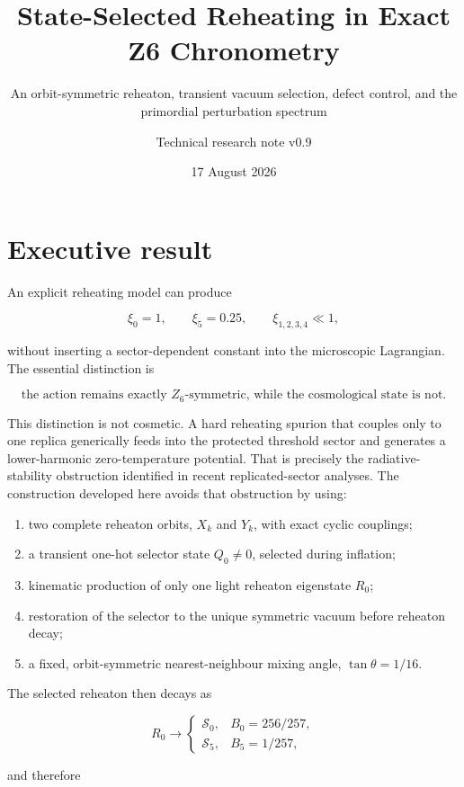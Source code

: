\documentclass[
  10pt,
]{article}
\title{State-Selected Reheating in Exact Z6 Chronometry}
\subtitle{An orbit-symmetric reheaton, transient vacuum selection,
defect control, and the primordial perturbation spectrum}
\author{Technical research note v0.9}
\date{17 August 2026}
\providecommand{\tightlist}{%
  \setlength{\itemsep}{0pt}\setlength{\parskip}{0pt}}
\begin{document}
\maketitle

{
\setcounter{tocdepth}{3}
\tableofcontents
}
\section{Executive result}\label{executive-result}

An explicit reheating model can produce

\[
\xi_0=1,
\qquad
\xi_5=0.25,
\qquad
\xi_{1,2,3,4}\ll1,
\]

without inserting a sector-dependent constant into the microscopic
Lagrangian. The essential distinction is

\[
\boxed{
\text{the action remains exactly }Z_6\text{-symmetric, while the cosmological state is not.}
}
\]

This distinction is not cosmetic. A hard reheating spurion that couples
only to one replica generically feeds into the protected threshold
sector and generates a lower-harmonic zero-temperature potential. That
is precisely the radiative-stability obstruction identified in recent
replicated-sector analyses. The construction developed here avoids that
obstruction by using:

\begin{enumerate}
\def\labelenumi{\arabic{enumi}.}
\tightlist
\item
  two complete reheaton orbits, \(X_k\) and \(Y_k\), with exact cyclic
  couplings;
\item
  a transient one-hot selector state \(Q_0\neq0\), selected during
  inflation;
\item
  kinematic production of only one light reheaton eigenstate \(R_0\);
\item
  restoration of the selector to the unique symmetric vacuum before
  reheaton decay;
\item
  a fixed, orbit-symmetric nearest-neighbour mixing angle,
  \(\tan\theta=1/16\).
\end{enumerate}

The selected reheaton then decays as

\[
R_0\longrightarrow
\begin{cases}
\mathcal S_0,&B_0=256/257,\\
\mathcal S_5,&B_5=1/257,
\end{cases}
\]

and therefore
\end{document}
